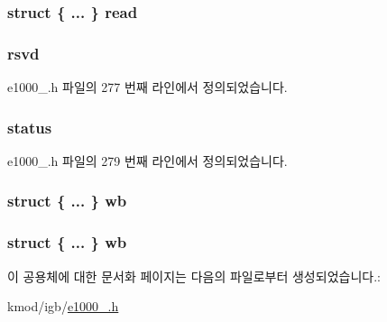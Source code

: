 \subsubsection[{\texorpdfstring{read}{read}}]{\setlength{\rightskip}{0pt plus 5cm}struct \{ ... \}   read}\hypertarget{unione1000__adv__tx__desc_aa510d85d9e755231a3744121f68dec7e}{}\label{unione1000__adv__tx__desc_aa510d85d9e755231a3744121f68dec7e}
\subsubsection[{\texorpdfstring{rsvd}{rsvd}}]{ rsvd}\hypertarget{unione1000__adv__tx__desc_afe5f3d676089fc80bb6e99fd5d5e067e}{}\label{unione1000__adv__tx__desc_afe5f3d676089fc80bb6e99fd5d5e067e}


e1000\+\_.\+h 파일의 277 번째 라인에서 정의되었습니다.

\subsubsection[{\texorpdfstring{status}{status}}]{ status}\hypertarget{unione1000__adv__tx__desc_acb1e7555dd5af8139307a5411606d576}{}\label{unione1000__adv__tx__desc_acb1e7555dd5af8139307a5411606d576}


e1000\+\_.\+h 파일의 279 번째 라인에서 정의되었습니다.

\subsubsection[{\texorpdfstring{wb}{wb}}]{\setlength{\rightskip}{0pt plus 5cm}struct \{ ... \}   wb}\hypertarget{unione1000__adv__tx__desc_acd3315da4a5fc38493b6a164103514c5}{}\label{unione1000__adv__tx__desc_acd3315da4a5fc38493b6a164103514c5}
\subsubsection[{\texorpdfstring{wb}{wb}}]{\setlength{\rightskip}{0pt plus 5cm}struct \{ ... \}   wb}\hypertarget{unione1000__adv__tx__desc_a8681d58b3313b5727b804f3e98bc90d3}{}\label{unione1000__adv__tx__desc_a8681d58b3313b5727b804f3e98bc90d3}


이 공용체에 대한 문서화 페이지는 다음의 파일로부터 생성되었습니다.\+:\begin{DoxyCompactItemize}
\item 
kmod/igb/\hyperlink{kmod_2igb_2e1000__82575_8h}{e1000\+\_.\+h}\end{DoxyCompactItemize}
